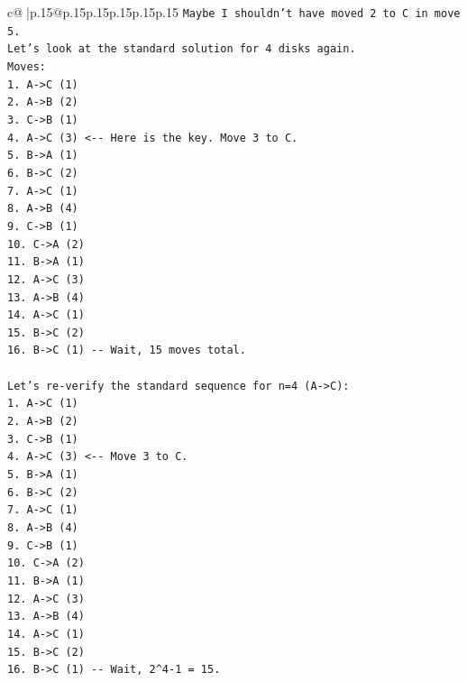 \documentclass{article}
\begin{document}
{\begin{supertabular}{c@{$\;$}|p{.15\linewidth}@{}p{.15\linewidth}p{.15\linewidth}p{.15\linewidth}p{.15\linewidth}p{.15\linewidth}}
{{{\texttt{Maybe I shouldn't have moved 2 to C in move 5.} \\
\texttt{Let's look at the standard solution for 4 disks again.} \\
\texttt{Moves:} \\
\texttt{1. A{-}>C (1)} \\
\texttt{2. A{-}>B (2)} \\
\texttt{3. C{-}>B (1)} \\
\texttt{4. A{-}>C (3)  <{-}{-} Here is the key. Move 3 to C.} \\
\texttt{5. B{-}>A (1)} \\
\texttt{6. B{-}>C (2)} \\
\texttt{7. A{-}>C (1)} \\
\texttt{8. A{-}>B (4)} \\
\texttt{9. C{-}>B (1)} \\
\texttt{10. C{-}>A (2)} \\
\texttt{11. B{-}>A (1)} \\
\texttt{12. A{-}>C (3)} \\
\texttt{13. A{-}>B (4)} \\
\texttt{14. A{-}>C (1)} \\
\texttt{15. B{-}>C (2)} \\
\texttt{16. B{-}>C (1) {-}{-} Wait, 15 moves total.} \\
\\ 
\texttt{Let's re{-}verify the standard sequence for n=4 (A{-}>C):} \\
\texttt{1. A{-}>C (1)} \\
\texttt{2. A{-}>B (2)} \\
\texttt{3. C{-}>B (1)} \\
\texttt{4. A{-}>C (3)  <{-}{-} Move 3 to C.} \\
\texttt{5. B{-}>A (1)} \\
\texttt{6. B{-}>C (2)} \\
\texttt{7. A{-}>C (1)} \\
\texttt{8. A{-}>B (4)} \\
\texttt{9. C{-}>B (1)} \\
\texttt{10. C{-}>A (2)} \\
\texttt{11. B{-}>A (1)} \\
\texttt{12. A{-}>C (3)} \\
\texttt{13. A{-}>B (4)} \\
\texttt{14. A{-}>C (1)} \\
\texttt{15. B{-}>C (2)} \\
\texttt{16. B{-}>C (1) {-}{-} Wait, 2\^{}4{-}1 = 15.} \\
}}}
\end{supertabular}}
\end{document}
